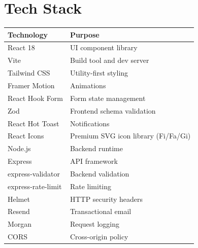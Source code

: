 \documentclass[11pt,a4paper]{article}
\begin{document}
\section{Tech Stack}
\begin{table}[h!]
\centering
\begin{tabularx}{\textwidth}{l X}
\toprule
\textbf{Technology} & \textbf{Purpose} \\
\midrule
React 18 & UI component library \\
Vite & Build tool and dev server \\
Tailwind CSS & Utility-first styling \\
Framer Motion & Animations \\
React Hook Form & Form state management \\
Zod & Frontend schema validation \\
React Hot Toast & Notifications \\
React Icons & Premium SVG icon library (Fi/Fa/Gi) \\
Node.js & Backend runtime \\
Express & API framework \\
express-validator & Backend validation \\
express-rate-limit & Rate limiting \\
Helmet & HTTP security headers \\
Resend & Transactional email \\
Morgan & Request logging \\
CORS & Cross-origin policy \\
\bottomrule
\end{tabularx}
\end{table}

\newpage
\end{document}
